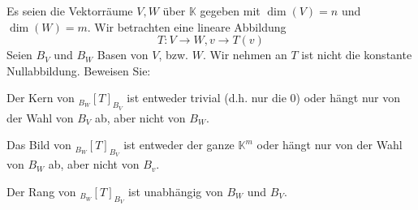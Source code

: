 \begin{Problem}
	Es seien die Vektorräume $V, W$ über $\mathbb{K}$ gegeben mit $\dim(V) = n$ und $\dim(W ) = m$. Wir betrachten eine lineare Abbildung
	\[
	T:V\to W, v\to T(v)\] 
Seien $B_V$ und $B_W$ Basen von $V$, bzw. $W$. Wir nehmen an $T$ ist nicht die konstante Nullabbildung. Beweisen Sie:
\begin{parts}
\item Der Kern von $_{B_W}[T]_{B_V}$ ist entweder trivial (d.h. nur die 0) oder hängt nur von der Wahl von $B_V$ ab, aber nicht von $B_W$.
\item Das Bild von $_{B_W}[T]_{B_V}$ ist entweder der ganze $\mathbb{K}^m$ oder hängt nur von der Wahl von $B_W$ ab, aber nicht von $B_v$. 
\item Der Rang von $_{B_W}[T]_{B_V}$ ist unabh\"{a}ngig von $B_W$ und $B_V$.
\end{parts}
\end{Problem}
